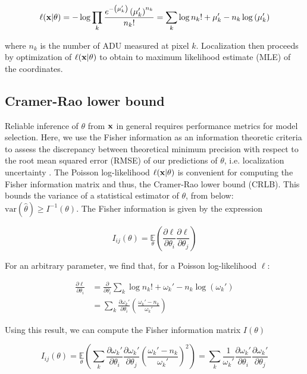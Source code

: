 \begin{equation}
\ell(\bold{x}\lvert\theta) = -\log \prod_{k} \frac{e^{-\left(\mu_{k}'\right)}\left(\mu_{k}'\right)^{n_{k}}}{n_{k}!} = \sum_{k}  \log n_{k}! + \mu_{k}' - n_{k}\log\left(\mu_{k}'\right)
\end{equation}

where $n_{k}$ is the number of ADU measured at pixel $k$. Localization then proceeds by optimization of $\ell(\bold{x}\lvert\theta)$ to obtain to maximum likelihood estimate (MLE) of the coordinates. 

\subsection{Cramer-Rao lower bound}

Reliable inference of $\theta$ from $\bold{x}$ in general requires performance metrics for model selection. Here, we use the Fisher information as an information theoretic criteria to assess the discrepancy between theoretical minimum precision with respect to the root mean squared error (RMSE) of our predictions of $\theta$, i.e. localization uncertainty \parencite{Chao2016}. The Poisson log-likelihood $\ell(\bold{x}\lvert\theta)$ is convenient for computing the Fisher information matrix \parencite{Smith2010} and thus, the Cramer-Rao lower bound (CRLB). This bounds the variance of a statistical estimator of $\theta$, from below: $\mathrm{var}(\hat{\theta}) \geq I^{-1}(\theta)$. The Fisher information is given by the expression

\begin{equation}
I_{ij}(\theta) = \underset{\theta}{\mathbb{E}}\left(\frac{\partial \ell}{\partial\theta_{i}}\frac{\partial\ell}{\partial\theta_{j}}\right) 
\end{equation}

For an arbitrary parameter, we find that, for a Poisson log-likelihood $\ell$:

\begin{align*}
\frac{\partial \ell}{\partial \theta_{i}} &= \frac{\partial}{\partial \theta_{i}} \sum_{k}  \log n_{k}! + \omega_{k}' - n_{k}\log\left(\omega_{k}'\right)\\
&= \sum_{k} \frac{\partial \omega_{k}'}{\partial\theta_{i}} \left(\frac{\omega_{k}'-n_{k}}{\omega_{k}'}\right)
\end{align*}

Using this result, we can compute the Fisher information matrix $I(\theta)$

\begin{equation}
I_{ij}(\theta) = \underset{\theta}{\mathbb{E}}\left(\sum_{k}\frac{\partial \omega_{k}'}{\partial\theta_{i}}\frac{\partial \omega_{k}'}{\partial\theta_{j}} \left(\frac{\omega_{k}'-n_{k}}{\omega_{k}'}\right)^{2}\right) = \sum_{k}\frac{1}{\omega_{k}'}\frac{\partial \omega_{k}'}{\partial\theta_{i}}\frac{\partial \omega_{k}'}{\partial\theta_{j}}
\end{equation}

